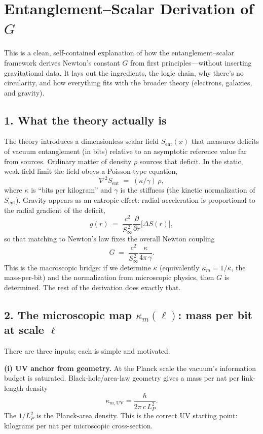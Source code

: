 \documentclass[11pt]{article}
\begin{document}
\appendix
\section*{Entanglement--Scalar Derivation of $G$}

This is a clean, self-contained explanation of how the entanglement--scalar framework derives Newton’s constant $G$ from first principles—without inserting gravitational data. It lays out the ingredients, the logic chain, why there’s no circularity, and how everything fits with the broader theory (electrons, galaxies, and gravity).

\subsection*{1. What the theory actually is}

The theory introduces a dimensionless scalar field $S_{\mathrm{ent}}(x)$ that measures deficits of vacuum entanglement (in bits) relative to an asymptotic reference value far from sources. Ordinary matter of density $\rho$ sources that deficit. In the static, weak-field limit the field obeys a Poisson-type equation,
\[
\nabla^2 S_{\mathrm{ent}} \;=\; (\kappa/\gamma)\,\rho,
\]
where $\kappa$ is “bits per kilogram” and $\gamma$ is the stiffness (the kinetic normalization of $S_{\mathrm{ent}}$). Gravity appears as an entropic effect: radial acceleration is proportional to the radial gradient of the deficit,
\[
g(r) \;=\; \frac{c^2}{S_\infty^{\,2}}\frac{\partial}{\partial r}\big[\Delta S(r)\big],
\]
so that matching to Newton’s law fixes the overall Newton coupling
\[
G \;=\; \frac{c^2}{S_\infty^{\,2}}\frac{\kappa}{4\pi\,\gamma}.
\]
This is the macroscopic bridge: if we determine $\kappa$ (equivalently $\kappa_m{=}1/\kappa$, the mass-per-bit) and the normalization from microscopic physics, then $G$ is determined. The rest of the derivation does exactly that.

\subsection*{2. The microscopic map $\kappa_m(\ell)$: mass per bit at scale $\ell$}

There are three inputs; each is simple and motivated.

\textbf{(i) UV anchor from geometry.} At the Planck scale the vacuum’s information budget is saturated. Black-hole/area-law geometry gives a mass per nat per link-length density
\[
\kappa_{m,\mathrm{UV}}=\frac{\hbar}{2\pi\,c\,L_P^2}.
\]
The $1/L_P^2$ is the Planck-area density. This is the correct UV starting point: kilograms per nat per microscopic cross-section.
\end{document}
